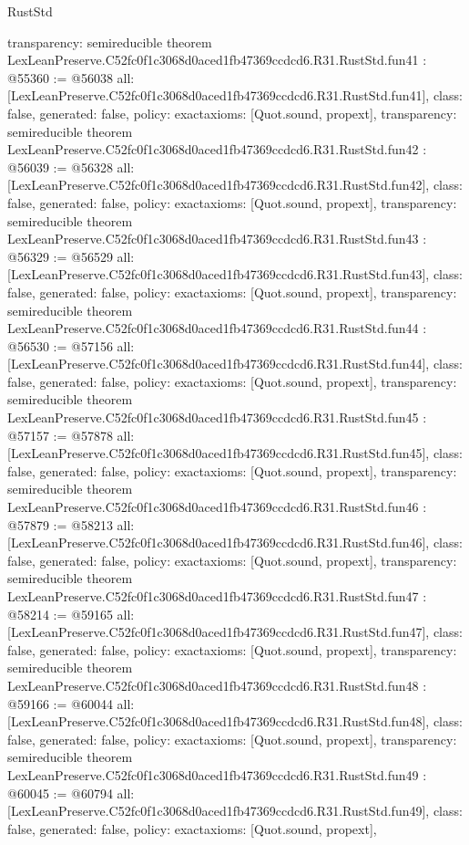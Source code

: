 \begin{lexlean}{RustStd}
\begin{coremodule}
{  transparency: semireducible
}
theorem LexLeanPreserve.C52fc0f1c3068d0aced1fb47369ccdcd6.R31.RustStd.fun41 : @55360 := @56038 {
  all: [LexLeanPreserve.C52fc0f1c3068d0aced1fb47369ccdcd6.R31.RustStd.fun41],
  class: false,
  generated: false,
  policy: exact{axioms: [Quot.sound, propext]},
  transparency: semireducible
}
theorem LexLeanPreserve.C52fc0f1c3068d0aced1fb47369ccdcd6.R31.RustStd.fun42 : @56039 := @56328 {
  all: [LexLeanPreserve.C52fc0f1c3068d0aced1fb47369ccdcd6.R31.RustStd.fun42],
  class: false,
  generated: false,
  policy: exact{axioms: [Quot.sound, propext]},
  transparency: semireducible
}
theorem LexLeanPreserve.C52fc0f1c3068d0aced1fb47369ccdcd6.R31.RustStd.fun43 : @56329 := @56529 {
  all: [LexLeanPreserve.C52fc0f1c3068d0aced1fb47369ccdcd6.R31.RustStd.fun43],
  class: false,
  generated: false,
  policy: exact{axioms: [Quot.sound, propext]},
  transparency: semireducible
}
theorem LexLeanPreserve.C52fc0f1c3068d0aced1fb47369ccdcd6.R31.RustStd.fun44 : @56530 := @57156 {
  all: [LexLeanPreserve.C52fc0f1c3068d0aced1fb47369ccdcd6.R31.RustStd.fun44],
  class: false,
  generated: false,
  policy: exact{axioms: [Quot.sound, propext]},
  transparency: semireducible
}
theorem LexLeanPreserve.C52fc0f1c3068d0aced1fb47369ccdcd6.R31.RustStd.fun45 : @57157 := @57878 {
  all: [LexLeanPreserve.C52fc0f1c3068d0aced1fb47369ccdcd6.R31.RustStd.fun45],
  class: false,
  generated: false,
  policy: exact{axioms: [Quot.sound, propext]},
  transparency: semireducible
}
theorem LexLeanPreserve.C52fc0f1c3068d0aced1fb47369ccdcd6.R31.RustStd.fun46 : @57879 := @58213 {
  all: [LexLeanPreserve.C52fc0f1c3068d0aced1fb47369ccdcd6.R31.RustStd.fun46],
  class: false,
  generated: false,
  policy: exact{axioms: [Quot.sound, propext]},
  transparency: semireducible
}
theorem LexLeanPreserve.C52fc0f1c3068d0aced1fb47369ccdcd6.R31.RustStd.fun47 : @58214 := @59165 {
  all: [LexLeanPreserve.C52fc0f1c3068d0aced1fb47369ccdcd6.R31.RustStd.fun47],
  class: false,
  generated: false,
  policy: exact{axioms: [Quot.sound, propext]},
  transparency: semireducible
}
theorem LexLeanPreserve.C52fc0f1c3068d0aced1fb47369ccdcd6.R31.RustStd.fun48 : @59166 := @60044 {
  all: [LexLeanPreserve.C52fc0f1c3068d0aced1fb47369ccdcd6.R31.RustStd.fun48],
  class: false,
  generated: false,
  policy: exact{axioms: [Quot.sound, propext]},
  transparency: semireducible
}
theorem LexLeanPreserve.C52fc0f1c3068d0aced1fb47369ccdcd6.R31.RustStd.fun49 : @60045 := @60794 {
  all: [LexLeanPreserve.C52fc0f1c3068d0aced1fb47369ccdcd6.R31.RustStd.fun49],
  class: false,
  generated: false,
  policy: exact{axioms: [Quot.sound, propext]},
}
\end{coremodule}
\end{lexlean}
